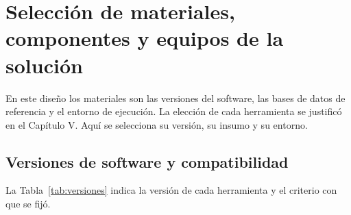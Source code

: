\section{Selección de materiales, componentes y equipos de la solución}

En este diseño los materiales son las versiones del software, las bases de
datos de referencia y el entorno de ejecución. La elección de cada herramienta
se justificó en el Capítulo V. Aquí se selecciona su versión, su insumo y su
entorno.

\subsection{Versiones de software y compatibilidad}
\label{subsec:versiones}

La Tabla~\ref{tab:versiones} indica la versión de cada herramienta y el
criterio con que se fijó.

